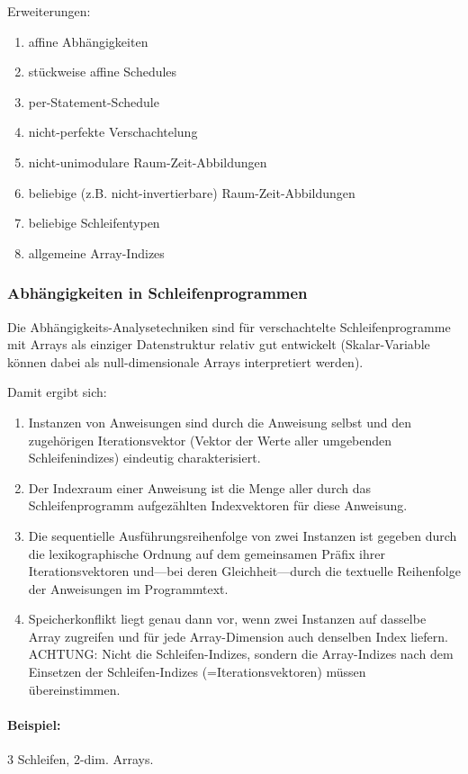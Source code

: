 Erweiterungen:
\begin{enumerate}
\item affine Abhängigkeiten
\item stückweise affine Schedules
\item per-Statement-Schedule
\item nicht-perfekte Verschachtelung
\item nicht-unimodulare Raum-Zeit-Abbildungen
\item beliebige (z.B. nicht-invertierbare) Raum-Zeit-Abbildungen
\item beliebige Schleifentypen
\item allgemeine Array-Indizes
\end{enumerate}


\subsubsection{Abhängigkeiten in Schleifenprogrammen}
Die Abhängigkeits-Analysetechniken sind für verschachtelte
Schleifenprogramme mit Arrays als einziger Datenstruktur relativ gut
entwickelt (Skalar-Variable können dabei als null-dimensionale Arrays
interpretiert werden).

Damit ergibt sich:
\begin{enumerate}
\item Instanzen von Anweisungen sind durch die Anweisung selbst und den
  zugehörigen Iterationsvektor (Vektor der Werte aller umgebenden
  Schleifenindizes) eindeutig charakterisiert.
\item Der Indexraum einer Anweisung ist die Menge aller durch das
  Schleifenprogramm aufgezählten Indexvektoren für diese Anweisung.
\item Die sequentielle Ausführungsreihenfolge von zwei Instanzen ist
  gegeben durch die lexikographische Ordnung auf dem gemeinsamen Präfix
  ihrer Iterationsvektoren und---bei deren Gleichheit---durch die
  textuelle Reihenfolge der Anweisungen im Programmtext.
\item Speicherkonflikt liegt genau dann vor, wenn zwei Instanzen auf
  dasselbe Array zugreifen und für jede Array-Dimension auch denselben
  Index liefern. ACHTUNG: Nicht die Schleifen-Indizes, sondern die
  Array-Indizes nach dem Einsetzen der Schleifen-Indizes
  (=Iterationsvektoren) müssen übereinstimmen.
\end{enumerate}

\paragraph{Beispiel:} 3 Schleifen, 2-dim. Arrays.

